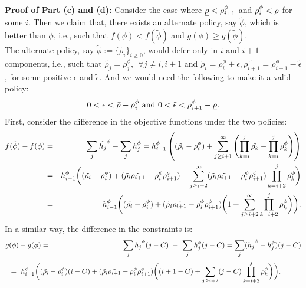 {\bf Proof of Part (c) and (d):} 
Consider the case  where  ${\underline \rho} < \rho^\phi_{i+1}$  and $\rho^\phi_i  < {\bar \rho}$ for some $i$.   Then we claim that, there exists an alternate policy, say $\tilde{\phi}$, which is better than $\phi$, i.e., such that $f(\phi) <  f(\tilde{\phi})$ and $g(\phi) \ge   g(\tilde{\phi})$.\\
%
The alternate policy, say  ${\tilde  \phi } := \{ \tilde{\rho_i}\}_{i \geq 0}$, would defer only in $i$ and $i+1$ components, i.e.,  such that $\tilde{\rho_j} = \rho^\phi_j, \ \ \forall j \neq i, i+1$ and $\tilde{\rho_i} = \rho^\phi_i + \epsilon, \tilde{\rho_{i+1}} = \rho^\phi_{i+1} - \tilde{\epsilon}$,  for some positive $\epsilon$ and $\tilde{\epsilon}$.    And we would need the following to make it a valid policy:
\begin{eqnarray}
\label{Eqn_conditions}
0 < \epsilon <  {\bar \rho} - \rho^\phi_i   \mbox{ and }  0 < {\tilde \epsilon} <    \rho^\phi_{i+1} - {\underline \rho}.
\end{eqnarray}
%
First, consider the difference in the objective functions under the two policies: 
\begin{eqnarray}
\label{Eqn_star}
f(\tilde{\phi}) - f(\phi) &=&  \sum_j \tilde{h_j}^\phi - \sum_j h_j^\phi = h_{i - 1}^\phi   \left ( ( \tilde{\rho_i} - \rho^\phi_i) + \sum_{j \geq i+1}^{\infty} \left  (\prod_{k = i}^j \tilde{\rho_k} - \prod_{k = i}^j  \rho^\phi_k \right ) \right )  \nonumber\\ \nonumber
&=& h_{i - 1}^\phi \bigg( (\tilde{\rho_i} - \rho^\phi_i) + (\tilde{\rho_i}\tilde{\rho_{i+1}} - \rho^\phi_i \rho^\phi_{i+1})   +  \sum_{j \geq i+2}^{\infty} (\tilde{\rho_i}\tilde{\rho_{i+1}} - \rho^\phi_i \rho^\phi_{i+1})  \prod_{k = i+2}^j  \rho^\phi_k \bigg) \nonumber \\
&=& h_{i - 1}^\phi \bigg( (\tilde{\rho_i} - \rho^\phi_i) +  (\tilde{\rho_i}\tilde{\rho_{i+1}} - \rho^\phi_i \rho^\phi_{i+1})\bigg(1 + \sum_{j \geq i+2}^{\infty} \prod_{k = i+2}^j  \rho^\phi_k \bigg) \bigg).
\end{eqnarray}
%
In a similar way, the difference in the constraints is:
\begin{eqnarray}
\label{Eqn_diff_constraints}
g(\tilde{\phi}) - g(\phi)  &=& \sum_j \tilde{\h_j}^\phi (j - C) \  - \ \sum_j \h_j^\phi (j - C)= \sum_j (\tilde{\h_j}^\phi - \h_j^\phi) (j - C)\nonumber  \\
&& \hspace{-22mm} = \ \h_{i-1}^\phi \bigg( (\tilde{\rho_i} - \rho^\phi_i)(i - C) +    (\tilde{\rho_i}\tilde{\rho_{i+1}} - \rho^\phi_i \rho^\phi_{i+1}) \bigg( (i+1-C) + \sum_{j \geq i+2} (j - C) \prod_{k = i+2}^{j} \rho^\phi_k    \bigg) \bigg). \hspace{10mm}
\end{eqnarray}
